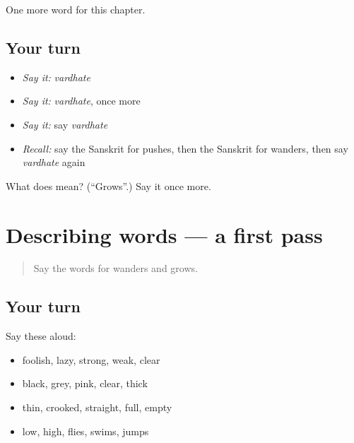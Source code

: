 \begin{grammarlens}[title={What you've built}]
One more word for this chapter.
\end{grammarlens}

\subsection*{Your turn}
\begin{itemize}
\raggedright
  \item \emph{Say it:} \emph{vardhate}
  \item \emph{Say it:} \emph{vardhate}, once more
  \item \emph{Say it:} say \emph{vardhate}
  \item \emph{Recall:} say the Sanskrit for pushes, then the Sanskrit for wanders, then say \emph{vardhate} again
\end{itemize}

\begin{tcolorbox}[breakable,colback=teal!4,colframe=teal!35!black,title={Before you move on}]
What does  mean? (\textquotedblleft{}Grows\textquotedblright{}.) Say it once more.
\end{tcolorbox}
\section[(dialogue)]{Describing words — a first pass}

\label{lesson:SA-R138-first-pass-describing-words}



\begin{quote}
Say the words for wanders and grows.
\end{quote}

\subsection*{Your turn}
Say these aloud:

\begin{itemize}
\raggedright
  \item foolish, lazy, strong, weak, clear
  \item black, grey, pink, clear, thick
  \item thin, crooked, straight, full, empty
  \item low, high, flies, swims, jumps
\end{itemize}


